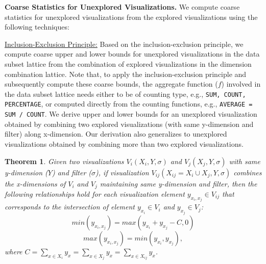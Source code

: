\textbf{Coarse Statistics for Unexplored Visualizations.} We compute coarse statistics for unexplored visualizations from the explored visualizations using the following techniques:

\underline{Inclusion-Exclusion Principle:} Based on the inclusion-exclusion principle, we compute coarse upper and lower bounds for unexplored visualizations in the data subset lattice from the combination of explored visualizations in the dimension combination lattice. Note that, to apply the inclusion-exclusion principle and subsequently compute these coarse bounds, the aggregate function ($f$) involved in the data subset lattice needs either to be of counting type, e.g., {\tt SUM, COUNT, PERCENTAGE}, or computed directly from the counting functions, e.g., {\tt AVERAGE = SUM / COUNT}. We derive upper and lower bounds for an unexplored visualization obtained by combining two explored visualizations (with same y-dimension and filter) along x-dimension. Our derivation also generalizes to unexplored visualizations obtained by combining more than two explored visualizations.
\newtheorem{theorem}{Theorem}
\begin{theorem}
Given two visualizations $V_i (X_i, Y, \sigma)$ and $V_j (X_j, Y, \sigma)$ with same y-dimension ($Y$) and filter ($\sigma$), if visualization $V_{ij} (X_{ij} = X_i \cup X_j, Y, \sigma)$ combines the x-dimensions of $V_i$ and $V_j$  maintaining same y-dimension and filter, then the following relationships hold for each visualization element $y_{x_i,x_j} {\in} V_{ij}$ that corresponds to the intersection of element $y_{x_{i}}{\in}V_{i}$ and $y_{x_{j}} {\in} V_{j}$: $$min(y_{x_i,x_j}) = max(y_{x_{i}} + y_{x_{j}} - C, 0)$$ $$max(y_{x_i,x_j}) = min(y_{x_{i}}, y_{x_{j}}),$$ where $C = \sum_{x \in X_i} y_x = \sum_{x \in X_j} y_x = \sum_{x \in X_{ij}} y_x$.
\end{theorem}

